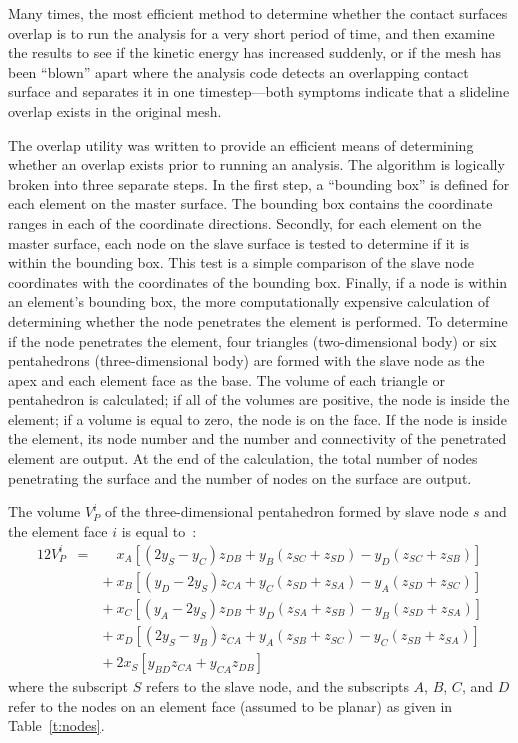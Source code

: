 Many times, the most efficient method to determine whether the contact
surfaces overlap is to run the analysis for a very short period of time,
and then examine the results to see if the kinetic energy has increased
suddenly, or if the mesh has been ``blown'' apart where the analysis
code detects an overlapping contact surface and separates it in one
timestep---both symptoms indicate that a slideline overlap exists in the
original mesh.

The overlap utility was written to provide an efficient means of
determining whether an overlap exists prior to running an analysis. The
algorithm is logically broken into three separate steps. In the first
step, a ``bounding box'' is defined for each element on the master
surface.  The bounding box contains the coordinate ranges in each of the
coordinate directions.   Secondly, for each element on the master
surface, each node on the slave surface is tested to determine if it is
within the bounding box.  This test is a simple comparison of the slave
node coordinates with the coordinates of the bounding box.  Finally, if
a node is within an element's bounding box, the more computationally
expensive calculation of determining whether the node penetrates the
element is performed.  To determine if the node penetrates the element,
four triangles (two-dimensional body) or six pentahedrons
(three-dimensional body) are formed with the slave node as the apex and
each element face as the base.  The volume of each triangle or
pentahedron is calculated; if all of the volumes are positive, the node
is inside the element; if a volume is equal to zero, the node is on
the face. If the node is inside the element, its node number and the
number and connectivity of the penetrated element are output.  At the
end of the calculation, the total number of nodes penetrating the
surface and the number of nodes on the surface are output.

The volume $V_P^i$ of the three-dimensional pentahedron formed by
slave node $s$ and the element face $i$ is equal
to~\cite{flanagan}:
\begin{eqnarray}
12V_P^i &=& \phantom{{}+{}}x_A[(2y_S - y_C)  z_{DB} + y_B  (z_{SC} + z_{SD}) -
     y_D  (z_{SC} + z_{SB})] \nonumber \\
&\ &  {}  + x_B[(y_D - 2y_S)  z_{CA} + y_C  (z_{SD} + z_{SA})-
     y_A  (z_{SD} + z_{SC})] \nonumber \\
&\ &  {}  + x_C[(y_A - 2y_S)  z_{DB} + y_D  (z_{SA} + z_{SB})-
     y_B  (z_{SD} + z_{SA})] \nonumber \\
&\ &  {}  + x_D[(2y_S - y_B)  z_{CA} + y_A  (z_{SB} + z_{SC})-
     y_C (z_{SB} + z_{SA})] \nonumber \\
&\ &  {}  + 2x_S[y_{BD} z_{CA} + y_{CA} z_{DB} ]
\end{eqnarray}
where the subscript $S$ refers to the slave node, and the subscripts
$A$, $B$, $C$, and $D$ refer to the nodes on an element face (assumed to
be planar) as given in Table~\ref{t:nodes}.

